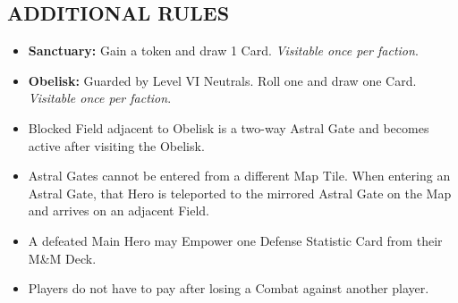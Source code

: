 \begin{multicols*}{2}
\subsection*{\MakeUppercase{Additional Rules}}
\begin{itemize}
  \item \textbf{Sanctuary:} Gain a  token and draw 1 Card. \textit{Visitable once per faction}.
  \item \textbf{Obelisk:} Guarded by Level VI Neutrals. Roll one  and draw one Card. \textit{Visitable once per faction}.
  \item Blocked Field adjacent to Obelisk is a two-way Astral Gate and becomes active after visiting the Obelisk.
  \item Astral Gates cannot be entered from a different Map Tile. When entering an Astral Gate, that Hero is teleported to the mirrored Astral Gate on the Map and arrives on an adjacent Field.
  \item A defeated Main Hero may Empower one Defense Statistic Card from their M\&M Deck.
  \item Players do not have to pay  after losing a Combat against another player.
\end{itemize}

\vspace*{\fill}

\end{multicols*}

